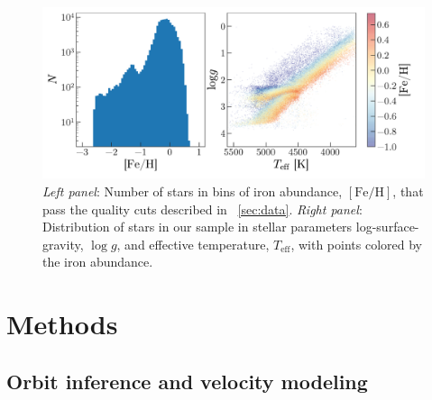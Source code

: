 \documentclass[modern, letterpaper]{aastex62}
\begin{document}
\begin{figure}[h]
\begin{center}
\includegraphics[width=\textwidth]{logg_teff_feh.pdf}
\end{center}
\caption{%
\textit{Left panel}: Number of stars in bins of iron abundance,
$[\textrm{Fe}/\textrm{H}]$, that pass the quality cuts described in
\sectionname~\ref{sec:data}.
\textit{Right panel}: Distribution of stars in our sample in stellar parameters
log-surface-gravity, $\log g$, and effective temperature, $T_{\textrm{eff}}$,
with points colored by the iron abundance.
\label{fig:loggteff}
}
\end{figure}


\section{Methods}

\subsection{Orbit inference and velocity modeling}
\label{sec:fitting}
\end{document}
